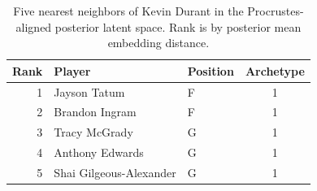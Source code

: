 \begin{table}[htbp]
  \centering\small
  \begin{tabular}{rllc}
    \toprule
    Rank & Player & Position & Archetype \\
    \midrule
    1 & Jayson Tatum & F & 1 \\
    2 & Brandon Ingram & F & 1 \\
    3 & Tracy McGrady & G & 1 \\
    4 & Anthony Edwards & G & 1 \\
    5 & Shai Gilgeous-Alexander & G & 1 \\
    \bottomrule
  \end{tabular}
  \caption{Five nearest neighbors of Kevin Durant in the Procrustes-aligned posterior latent space. Rank is by posterior mean embedding distance.}
  \label{tab:Kevin_Durant_neighbors}
\end{table}


